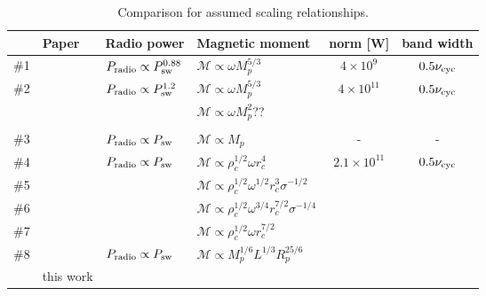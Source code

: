 \documentclass[iop,numberedappendix,apj]{emulateapj}
\begin{document}
\begin{table*}[htp]
\caption{Comparison for assumed scaling relationships.}
\begin{center}
\begin{tabular}{c|l|llcc} \hline \hline
%
& Paper & Radio power & Magnetic moment  & norm [W] & band width \\\hline
%
\#1 & \citet{farrell1999} & $P_{\rm radio} \propto P_{\rm sw}^{0.88} $ & $\mathcal{M} \propto \omega M_p^{5/3}$ & $4 \times 10^9$ & $ 0.5 \nu_{\rm cyc}$ \\ \hline
%
\#2 & \citet{farrell1999} & $P_{\rm radio} \propto P_{\rm sw}^{1.2} $ & $\mathcal{M} \propto \omega M_p^{5/3}$ & $4 \times 10^{11}$ & $ 0.5 \nu_{\rm cyc}$ \\
& \citet{lazio2004} & & $\mathcal{M} \propto \omega M_p^{2}$?? & & \\
& \citet{ignace2010} & & & & \\ \hline
\#3 & \citet{stevens2005} & $P_{\rm radio} \propto P_{\rm sw} $ & $\mathcal{M} \propto M_p$ & - & - \\ \hline
\#4 & \citet{griesmeier2005,griesmeier2007a,griesmeier2007b} & $P_{\rm radio} \propto P_{\rm sw}$ & $\mathcal{M} \propto \rho _c^{1/2} \omega r_c^4 $ & $2.1 \times 10^{11}$ & $ 0.5 \nu_{\rm cyc}$ \\
\#5 & & & $\mathcal{M} \propto \rho _c^{1/2} \omega^{1/2} r_c^3 \sigma ^{-1/2} $ & & \\
\#6 & & & $\mathcal{M} \propto \rho _c^{1/2} \omega^{3/4} r_c^{7/2} \sigma ^{-1/4} $ & \\
\#7 & & & $\mathcal{M} \propto \rho _c^{1/2} \omega r_c^{7/2}$ & & \\ \hline
\#8 & \citet{reiners2010} & $P_{\rm radio} \propto P_{\rm sw}$ & $\mathcal{M} \propto M_p^{1/6} L^{1/3} R_p^{25/6}$ \\ 
 & this work & & \\ \hline
\end{tabular}
\end{center}
\label{tab:comp}
\tablecomments{}
\end{table*}
\end{document}
